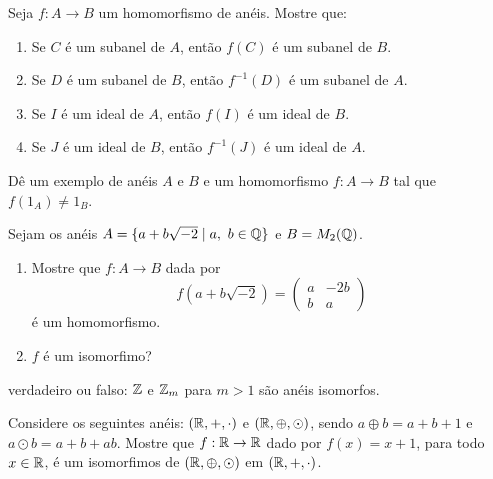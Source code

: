 \documentclass[12pt]{article}
\begin{document}
\vesp

\questao Seja $f: A \to B$ um homomorfismo de an{\'e}is. Mostre que:
\begin{enumerate}[label=({\alph*})]
\item Se $C$  {\'e} um subanel de $A$, ent{\~a}o $f(C)$ {\'e} um subanel de $B$.
\item Se $D$ {\'e} um subanel de $B$, ent{\~a}o $f^{-1}(D)$ {\'e} um subanel de $A$.
\item Se $I$ {\'e} um ideal de $A$, ent{\~a}o $f(I)$ {\'e} um ideal de $B$.
\item Se $J$ {\'e} um ideal de $B$, ent{\~a}o $f^{-1}(J)$ {\'e} um ideal de $A$.
\end{enumerate}

\vesp

\questao D{\^e} um exemplo de an{\'e}is $A$ e $B$ e um homomorfismo $f : A \to B$ tal que $f(1_A) \ne 1_B$.

\vesp

\questao Sejam os an{\'e}is $A = \{ a + b\sqrt{-2} \mid a,\ b \in \mathbb{Q}\}$ e $B = M_2(\mathbb{Q})$.
\begin{enumerate}[label=({\alph*})]
\item Mostre que $f : A \to B$ dada por
\[
f(a + b\sqrt{-2}) =
\begin{pmatrix}
a & -2b\\
b & a
\end{pmatrix}
\]
{\'e} um homomorfismo.
\item $f$ {\'e} um isomorfimo?
\end{enumerate}

 verdadeiro ou falso: $\mathbb{Z}$ e $\mathbb{Z}_{m}$ para $m > 1$ s{\~a}o an{\'e}is
isomorfos.

\vesp

\questao Considere os seguintes an{\'e}is: $(\mathbb{R}, +, \cdot)$ e $(\mathbb{R}, \oplus, \odot)$, sendo $a \oplus b = a + b + 1$ e $a \odot b = a + b + ab$. Mostre que $f : \mathbb{R} \to \mathbb{R}$ dado por $f(x) = x + 1$, para todo $x \in \mathbb{R}$, {\'e} um isomorfimos de $(\mathbb{R}, \oplus, \odot)$ em $(\mathbb{R}, +, \cdot)$.
\end{document}
